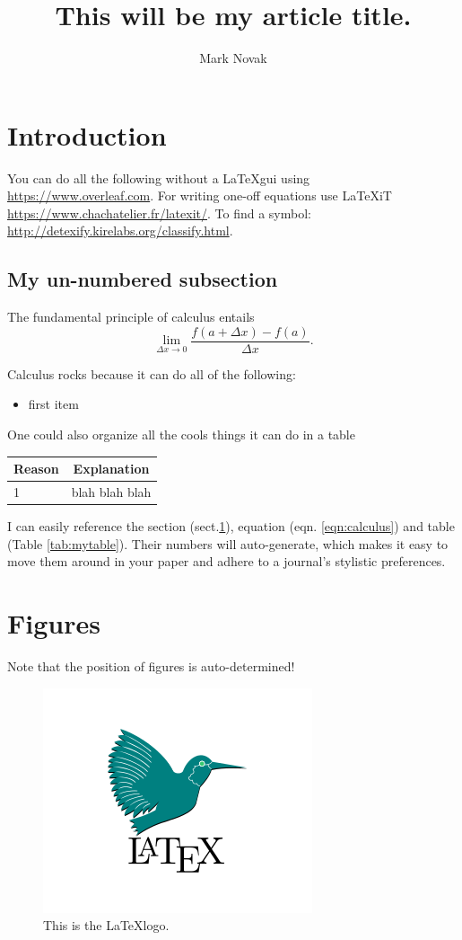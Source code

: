 \documentclass[12pt,letterpaper]{article}
\author{Mark Novak}
\title{This will be my article title.}
\begin{document}
\maketitle

\tableofcontents %

\pagebreak

\section{Introduction } \label{sec:intro} %

You can do all the following without a \LaTeX gui using \url{https://www.overleaf.com}.  For writing one-off equations use LaTeXiT \url{https://www.chachatelier.fr/latexit/}.  To find a symbol:  \url{http://detexify.kirelabs.org/classify.html}.

\subsection*{My un-numbered subsection}

The fundamental principle of calculus entails
\begin{equation}
	\label{eqn:calculus}
	\lim_{{\Delta x} \to 0}\frac{f(a+\Delta x)-f(a)}{\Delta x}.
\end{equation}

\noindent %
Calculus rocks because it can do all of the following:
\begin{itemize} 
	\item first item
\end{itemize}

One could also organize all the cools things it can do in a table
\begin{center}
\begin{tabular}{l c} %
	\label{tab:mytable}
		Reason & Explanation\\ %
		 \hline
		1 & blah blah blah \\ 
 		 \hline
\end{tabular}
\end{center}

I can easily reference the section (sect.\ref{sec:intro}), equation (eqn. \ref{eqn:calculus}) and table (Table \ref{tab:mytable}).  Their numbers will auto-generate, which makes it easy to move them around in your paper and adhere to a journal's stylistic preferences.

\section{Figures}
Note that the position of figures is auto-determined!

\begin{figure}
	\centering
	\includegraphics[width=0.2\linewidth]{figs/LaTeX_logo.png}
	\caption{This is the \LaTeX logo.}
	\label{fig:logo}
\end{figure}
\end{document}
